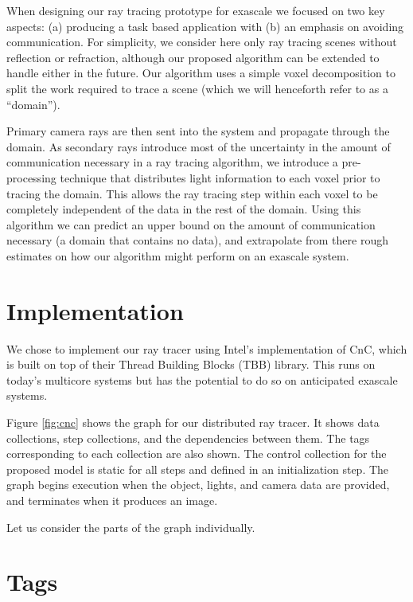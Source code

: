 \label{sec:raytracing}

When designing our ray tracing prototype for exascale we focused on
two key aspects: (a) producing a task based application with (b) an
emphasis on avoiding communication. For simplicity, we consider here
only ray tracing scenes without reflection or refraction, although our
proposed algorithm can be extended to handle either in the future. Our
algorithm uses a simple voxel decomposition to split the work required
to trace a scene (which we will henceforth refer to as a ``domain'').

Primary camera rays are then sent into the system and propagate
through the domain. As secondary rays introduce most of the uncertainty
in the amount of communication necessary in a ray tracing algorithm,
we introduce a pre-processing technique that distributes light
information to each voxel prior to tracing the domain. This allows the
ray tracing step within each voxel to be completely independent of the
data in the rest of the domain. Using this algorithm we can predict an
upper bound on the amount of communication necessary (a domain that
contains no data), and extrapolate from there rough estimates on how
our algorithm might perform on an exascale system.

\section{Implementation}

We chose to implement our ray tracer using Intel’s implementation of
CnC, which is built on top of their Thread Building Blocks (TBB)
library. This runs on today’s multicore systems but has the potential
to do so on anticipated exascale systems.

Figure \ref{fig:cnc} shows the graph for our distributed ray tracer.
It shows data collections, step collections, and the dependencies
between them. The tags corresponding to each collection are also
shown. The control collection for the proposed model is static for all
steps and defined in an initialization step. The graph begins
execution when the object, lights, and camera data are provided, and
terminates when it produces an image.

Let us consider the parts of the graph individually.

\section{Tags}

